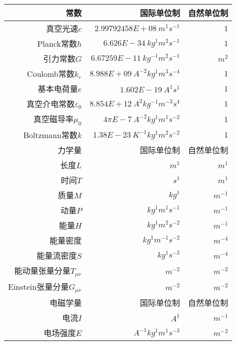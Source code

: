 			\begin{table}[!htbp]
			\centering
			
			\begin{tabular*}{\hsize}{@{}@{\extracolsep{\fill}}rrr@{}}
				\toprule
				常数							&				国际单位制					&	自然单位制	\\
				\midrule
				真空光速$c$							&	$2.99792458E+08\ m^{1}s^{-1}$			&	$1$							\\
				Planck常数$h$					&	$6.626E-34\ kg^{1}m^{2}s^{-1}$			&	$1$							\\
				引力常数$G$						&	$6.67259E-11\ kg^{-1}m^{2}s^{-1}$		&	$m^{2}$						\\
				Coulomb常数$k_e$				&	$8.988E+09\ A^{-2}kg^{1}m^{3}s^{-4}$	&	$1$							\\
				基本电荷量$e$					&	$1.602E-19\ A^{1}s^{1}$					&	$1$							\\
				真空介电常数$\varepsilon_0$		&	$8.854E+12\ A^{2}kg^{-1}m^{-3}s^{4}$	&	$1$							\\
				真空磁导率$\mu_0$				&	$4\pi E-7\ A^{-2}kg^{1}m^{1}s^{-2}$		&	$1$							\\
				Boltzmann常数$k$				&	$1.38 E-23\ K^{-1}kg^{1}m^{2}s^{-2}$	&	$1$							\\
				\midrule
				力学量							&				国际单位制					&	自然单位制	\\
				\midrule
				长度$L$							&	$m^{1}$									&	 $m^{1}$					\\
				时间$T$							&	$s^{1}$									&	 $m^{1}$					\\
				质量$M$							&	$kg^{1}$								&	 $m^{-1}$					\\
				动量$P$							&	$kg^{1}m^{1}s^{-1}$						&	 $m^{-1}$					\\
				能量$H$							&	$kg^{1}m^{2}s^{-2}$						&	$m^{-1}$					\\
				能量密度						&	$kg^{1}m^{-1}s^{-2}$					&	$m^{-4}$					\\
				能量流密度$S$					&	$kg^{1}s^{-3}$							&	$m^{-4}$					\\
				能动量张量分量$T_{\mu\nu}$		&	$m^{-2}$								&	$m^{-2}$					\\
				Einstein张量分量$G_{\mu\nu}$	&	$m^{-2}$								&	$m^{-2}$					\\
				\midrule
				电磁学量						&				国际单位制					&	自然单位制	\\
				\midrule
				电流$I$							&	$A^{1}$									&	 $m^{-1}$					\\
				电场强度$E$						&	$A^{-1}kg^{1}m^{1}s^{-3}$				&	 $m^{-2}$					\\

\end{tabular*}
\end{table}
